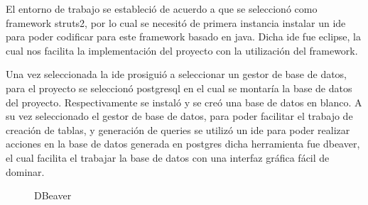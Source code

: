 El entorno de trabajo se estableció de acuerdo a que se seleccionó como framework struts2, por lo cual se necesitó de primera instancia instalar un ide para poder codificar para este framework basado en java. Dicha ide fue eclipse, la cual nos facilita la implementación del proyecto con la utilización del framework.  
\begin{figure}[htbp!]
	\begin{center}
	\end{center}
\end{figure}
\newline \newline
Una vez seleccionada la ide prosiguió a seleccionar un gestor de base de datos, para el proyecto se seleccionó postgresql en el cual se montaría la base de datos del proyecto. Respectivamente se instaló y se creó una base de datos en blanco. 
\newline \newline
A su vez seleccionado el gestor de base de datos, para poder facilitar el trabajo de creación de tablas, y generación de queries se utilizó un ide para poder realizar acciones en la base de datos generada en postgres dicha herramienta fue dbeaver, el cual facilita el trabajar la base de datos con una interfaz gráfica fácil de dominar.
\newline \newline
\begin{figure}[htbp!]
	\begin{center}
		\caption{DBeaver}
		\label{fig:DBeaver}
	\end{center}
\end{figure}


